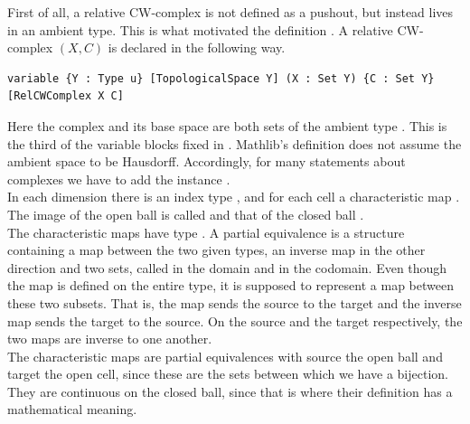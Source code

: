 \documentclass[11pt, a4paper, english]{article}
\theoremstyle{plain}
\theoremstyle{definition}
\theoremstyle{remark}
\numberwithin{equation}{section}
\numberwithin{theorem}{section}
\begin{document}
First of all, a relative CW-complex is not defined as a pushout, but instead lives in an ambient type. This is what motivated the definition . A relative CW-complex $(X,C)$ is declared in the following way. 
\begin{verbatim}
variable {Y : Type u} [TopologicalSpace Y] (X : Set Y) {C : Set Y} [RelCWComplex X C]
\end{verbatim}
Here the complex  and its base space  are both sets of the ambient type . This is the third of the variable blocks fixed in . Mathlib's definition does not assume the ambient space to be Hausdorff. Accordingly, for many statements about complexes we have to add the instance \lean{[T2Space Y]}. \\
In each dimension there is an index type , and for each cell a characteristic map . The image of the open ball is called  and that of the closed ball . \\
The characteristic maps have type . A partial equivalence is a structure containing a map between the two given types, an inverse map in the other direction and two sets, called  in the domain and  in the codomain. Even though the map is defined on the entire type, it is supposed to represent a map between these two subsets. That is, the map sends the source to the target and the inverse map sends the target to the source. On the source and the target respectively, the two maps are inverse to one another. \\
The characteristic maps are partial equivalences with source the open ball and target the open cell, since these are the sets between which we have a bijection. They are continuous on the closed ball, since that is where their definition has a mathematical meaning.\\
\end{document}
